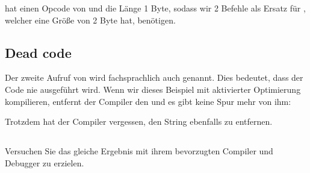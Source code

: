 \NOP hat einen Opcode von  und die Länge 1 Byte, sodass wir 2 Befehle als Ersatz für \JMP, welcher eine Größe
von 2 Byte hat, benötigen.

\subsection{Dead code}
Der zweite Aufruf von \printf wird fachsprachlich auch  genannt.
Dies bedeutet, dass der Code nie ausgeführt wird. Wenn wir dieses Beispiel mit aktivierter Optimierung kompilieren,
entfernt der Compiler den  und es gibt keine Spur mehr von ihm:



Trotzdem hat der Compiler vergessen, den  String ebenfalls zu entfernen.


\subsection{\Exercise}

Versuchen Sie das gleiche Ergebnis mit ihrem bevorzugten Compiler und Debugger zu erzielen.


